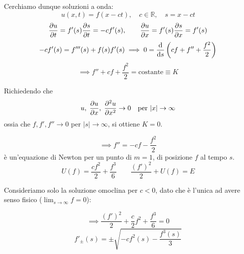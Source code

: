 Cerchiamo dunque soluzioni a onda:
\begin{equation}
    u(x,t) = f(x-ct), \quad c \in \mathbb{R}, \quad s = x - ct
\end{equation}
\begin{equation}
    \pdv{u}{t} = f'(s)\pdv{s}{t} = -c f'(s), 
    \qquad 
    \pdv{u}{x} = f'(s)\pdv{s}{x} = f'(s)
\end{equation}
\begin{equation}
    -c f'(s) = f'''(s) + f(s)f'(s)
    \implies 0 = \dv{s}\left( c f + f'' + \frac{f^2}{2} \right)
\end{equation}
\begin{equation}
    \implies f'' + c f + \frac{f^2}{2} = \text{costante} \equiv K
\end{equation}

Richiedendo che 
\[
u, \; \pdv{u}{x}, \; \pdv[2]{u}{x} \to 0 \quad \text{per } |x|\to\infty
\]
ossia che $f, f', f'' \to 0$ per $|s|\to\infty$, si ottiene $K =0$.

\begin{equation}
    \implies f'' = -c f - \frac{f^2}{2}
\end{equation}
è un'equazione di Newton per un punto di $m= 1$, di posizione $f $ al tempo $s $.
\begin{equation}
    U( f ) = \frac{cf^2}{2}+ \frac{f^3}{6} \qquad \frac{(f')^2}{2}+ U(f)= E 
\end{equation}

Consideriamo solo la soluzione omoclina per $c<0 $, dato che è l'unica ad avere senso fisico ($\lim_{s\rightarrow\infty}f=0$):

\begin{equation}
   \implies \frac{(f')^2}{2} + \frac{c}{2}f^2 + \frac{f^3}{6} = 0
\end{equation}
\begin{equation}
    f'_{\pm}(s) = \pm \sqrt{-c f^2(s) - \frac{f^3(s)}{3}}
\end{equation}





